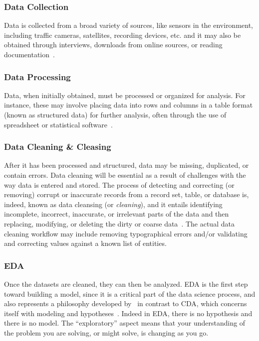 \subsubsection{Data Collection}
Data is collected from a broad variety of sources, like sensors in the environment, including traffic cameras, satellites, recording devices, etc. and 
it may also be obtained through interviews, downloads from online sources, or reading documentation~\cite{Book:doing_data_science}.

\subsubsection{Data Processing}
Data, when initially obtained, must be processed or organized for analysis.
For instance, these may involve placing data into rows and columns in a table format (known as structured data) for further analysis, often through the use of spreadsheet or statistical software~\cite{Book:doing_data_science}.

\subsubsection{Data Cleaning \& Cleasing}
After it has been processed and structured, data may be missing, duplicated, or contain errors. Data cleaning will be essential as a result of challenges with the way data is entered and stored.
The process of detecting and correcting (or removing) corrupt or inaccurate records from a record set, table, or database is, indeed, known as data cleansing (or \textit{cleaning}), 
and it entails identifying incomplete, incorrect, inaccurate, or irrelevant parts of the data and then replacing, modifying, or deleting the dirty or coarse data~\cite{Misc:2019_data_cleaning_wiki}.
The actual data cleaning workflow may include removing typographical errors and/or validating and correcting values against a known list of entities.

\subsubsection{\acl{EDA}}
Once the datasets are cleaned, they can then be analyzed.
\ac{EDA} is the first step toward building a model, since it is a critical part of the data science process, and also represents a philosophy developed by~\citeauthor{Article:future_of_data_tukey} 
in contrast to \ac{CDA}, which concerns itself with modeling and hypotheses~\cite{Article:future_of_data_tukey}. 
Indeed in \ac{EDA}, there is no hypothesis and there is no model. The ``exploratory'' aspect means that your understanding of the problem you are solving, or might solve, is changing as you go.

